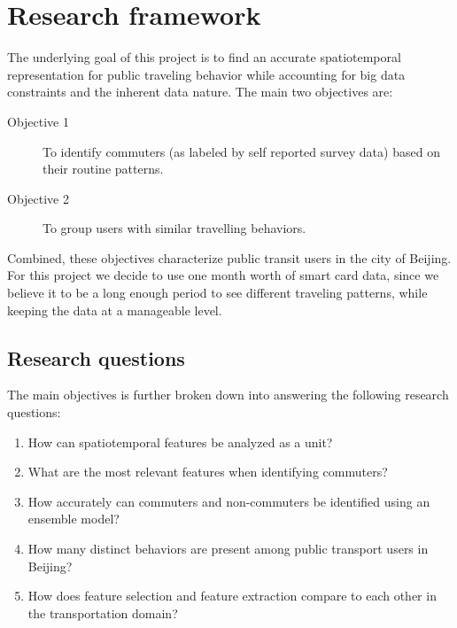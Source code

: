 \documentclass{article}
\begin{document}





\newpage
\section{Research framework}
The underlying goal of this project is to find an accurate spatiotemporal representation for public traveling behavior while accounting for big data constraints and the inherent data nature. The main two objectives are:

\begin{description}
\item[Objective 1] To identify commuters (as labeled by self reported survey data) based on their routine patterns. \label{eqn:obj1}
\item[Objective 2] To group users with similar travelling behaviors. \label{eqn:obj2}
\end{description}

Combined, these objectives characterize public transit users in the city of Beijing. For this project we decide to use one month worth of smart card data, since we believe it to be a long enough period to see different traveling patterns, while keeping the data at a manageable level. 

\subsection{Research questions}
The main objectives is further broken down into answering the following research questions: 

\begin{enumerate}

\item How can spatiotemporal features be analyzed as a unit?

\item What are the most relevant features when identifying commuters?

\item How accurately can commuters and non-commuters be identified using an ensemble model? 

\item How many distinct behaviors are present among public transport users in Beijing?

\item How does feature selection and feature extraction compare to each other in the transportation domain?

\end{enumerate}
\end{document}
